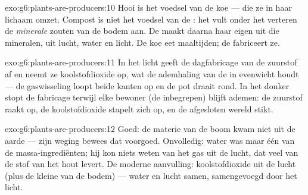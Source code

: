 \begin{solution}{exo:g6:plants-are-producers:10}
Hooi is het voedsel van de koe ---  die ze in haar
lichaam omzet. Compost is niet het voedsel van de : het vult onder
het verteren de \emph{minerale} zouten van de bodem aan. De  maakt
daarna haar eigen  uit die mineralen, uit lucht, water
en licht. De koe eet maaltijden; de  fabriceert ze.
\end{solution}

\begin{solution}{exo:g6:plants-are-producers:11}
In het licht geeft de dagfabricage van de  zuurstof af en neemt ze
koolstofdioxide op, wat de ademhaling van de  in evenwicht houdt
--- de gaswisseling loopt beide kanten op en de pot draait rond. In het
donker stopt de fabricage terwijl elke bewoner (de  inbegrepen)
blijft ademen: de zuurstof raakt op, de koolstofdioxide stapelt zich op,
en de afgesloten wereld stikt.
\end{solution}

\begin{solution}{exo:g6:plants-are-producers:12}
Goed: de materie van de boom kwam niet uit de aarde --- zijn weging
bewees dat voorgoed. Onvolledig: water was maar één van de
massa-ingrediënten; hij kon niets weten van het gas uit de lucht, dat
veel van de stof van het hout levert. De moderne aanvulling:
koolstofdioxide uit de lucht (plus de kleine  van de
bodem) --- water en lucht samen, samengevoegd door het licht.
\end{solution}

